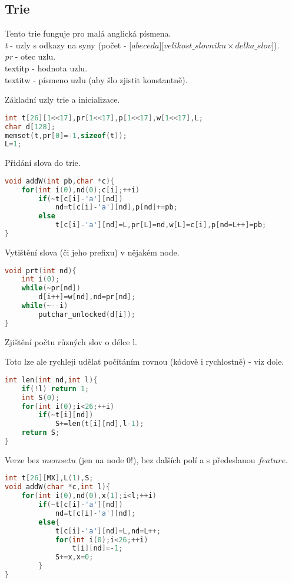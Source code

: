 \documentclass[11pt]{article}
\begin{document}
\subsection{Trie}
Tento trie funguje pro malá anglická písmena.
\\\textit{t} - uzly s odkazy na syny (počet - [$abeceda$][$velikost\_slovniku\times delka\_slov$]).
\\\textit{pr} - otec uzlu.
\\textit{p} - hodnota uzlu.
\\textit{w} - písmeno uzlu (aby šlo zjistit konstantně).
\begin{center}
Základní uzly trie a inicializace.
\end{center}
\begin{lstlisting}[language=C++]
int t[26][1<<17],pr[1<<17],p[1<<17],w[1<<17],L;
char d[128];
memset(t,pr[0]=-1,sizeof(t));
L=1;
\end{lstlisting}
\begin{center}
Přidání slova do trie.
\end{center}
\begin{lstlisting}[language=C++]
void addW(int pb,char *c){
    for(int i(0),nd(0);c[i];++i)
        if(~t[c[i]-'a'][nd])
            nd=t[c[i]-'a'][nd],p[nd]+=pb;
        else
            t[c[i]-'a'][nd]=L,pr[L]=nd,w[L]=c[i],p[nd=L++]=pb;
}
\end{lstlisting}
\begin{center}
Vytištění slova (či jeho prefixu) v nějakém node.
\end{center}
\begin{lstlisting}[language=C++]
void prt(int nd){
    int i(0);
    while(~pr[nd])
        d[i++]=w[nd],nd=pr[nd];
    while(~--i)
        putchar_unlocked(d[i]);
}
\end{lstlisting}
\begin{center}
Zjištění počtu různých slov o délce \textsf{l}.
\end{center}
Toto lze ale rychleji udělat počítáním rovnou (kódově i rychlostně) - viz dole.
\begin{lstlisting}[language=C++]
int len(int nd,int l){
    if(!l) return 1;
    int S(0);
    for(int i(0);i<26;++i)
        if(~t[i][nd])
            S+=len(t[i][nd],l-1);
    return S;
}
\end{lstlisting}
Verze bez $memsetu$ (jen na node 0!), bez dalších polí a s předeslanou $feature$.
\begin{lstlisting}[language=C++]
int t[26][MX],L(1),S;
void addW(char *c,int l){
    for(int i(0),nd(0),x(1);i<l;++i)
        if(~t[c[i]-'a'][nd])
            nd=t[c[i]-'a'][nd];
        else{
            t[c[i]-'a'][nd]=L,nd=L++;
            for(int i(0);i<26;++i)
                t[i][nd]=-1;
            S+=x,x=0;
        }
}
\end{lstlisting}
\end{document}
